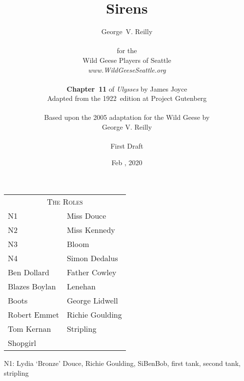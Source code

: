 


\title{\Huge Sirens}
\author{George~V. Reilly\\
\\
{\small for the}\\
Wild Geese Players of Seattle\\
{\textit{www.WildGeeseSeattle.org}}\\
\\
{\small \textbf{Chapter~11} of \textit{Ulysses} by James Joyce}\\
{\small Adapted from the 1922~edition at Project Gutenberg}
\\
\\
{\small Based upon the 2005 adaptation for the Wild Geese by}\\
{\small George V. Reilly}\\
\\
{\small First Draft}}
\date{Feb , 2020}
\raggedbottom



\maketitle
\thispagestyle{empty}
\pagebreak

\begin{tabular}{lp{10cm}}
    \multicolumn{2}{c}{\Large \textsc{The Roles}} \\
N1              & Miss Douce \\
N2              & Miss Kennedy \\
N3              & Bloom \\
N4              & Simon Dedalus \\
Ben Dollard     & Father Cowley \\
Blazes Boylan   & Lenehan \\
Boots           & George Lidwell \\
Robert Emmet    & Richie Goulding \\
Tom Kernan      & Stripling \\
Shopgirl \\
\end{tabular}

\bigskip

N1: Lydia ‘Bronze’ Douce,
Richie Goulding,
SiBenBob,
first tank,
second tank,
stripling

